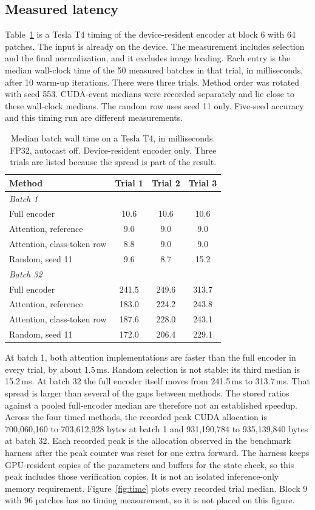 \documentclass[11pt]{article}
\begin{document}
\FloatBarrier
\subsection{Measured latency}
Table~\ref{tab:time} is a Tesla T4 timing of the device-resident encoder at block 6 with 64 patches.
The input is already on the device.
The measurement includes selection and the final normalization, and it excludes image loading.
Each entry is the median wall-clock time of the 50 measured batches in that trial, in milliseconds, after 10 warm-up iterations.
There were three trials.
Method order was rotated with seed 553.
CUDA-event medians were recorded separately and lie close to these wall-clock medians.
The random row uses seed 11 only.
Five-seed accuracy and this timing run are different measurements.

\begin{table}[t]
\centering
\caption{Median batch wall time on a Tesla T4, in milliseconds. FP32, autocast off. Device-resident encoder only. Three trials are listed because the spread is part of the result.}
\label{tab:time}
\small
\begin{tabular}{lccc}
\toprule
Method & Trial 1 & Trial 2 & Trial 3 \\
\midrule
\multicolumn{4}{l}{\emph{Batch 1}} \\
Full encoder & 10.6 & 10.6 & 10.6 \\
Attention, reference & 9.0 & 9.0 & 9.0 \\
Attention, class-token row & 8.8 & 9.0 & 9.0 \\
Random, seed 11 & 9.6 & 8.7 & 15.2 \\
\midrule
\multicolumn{4}{l}{\emph{Batch 32}} \\
Full encoder & 241.5 & 249.6 & 313.7 \\
Attention, reference & 183.0 & 224.2 & 243.8 \\
Attention, class-token row & 187.6 & 228.0 & 243.1 \\
Random, seed 11 & 172.0 & 206.4 & 229.1 \\
\bottomrule
\end{tabular}
\end{table}

At batch 1, both attention implementations are faster than the full encoder in every trial, by about 1.5\,ms.
Random selection is not stable: its third median is 15.2\,ms.
At batch 32 the full encoder itself moves from 241.5\,ms to 313.7\,ms.
That spread is larger than several of the gaps between methods.
The stored ratios against a pooled full-encoder median are therefore not an established speedup.
Across the four timed methods, the recorded peak CUDA allocation is 700{,}060{,}160 to 703{,}612{,}928 bytes at batch 1 and 931{,}190{,}784 to 935{,}139{,}840 bytes at batch 32.
Each recorded peak is the allocation observed in the benchmark harness after the peak counter was reset for one extra forward.
The harness keeps GPU-resident copies of the parameters and buffers for the state check, so this peak includes those verification copies.
It is not an isolated inference-only memory requirement.
Figure~\ref{fig:time} plots every recorded trial median.
Block 9 with 96 patches has no timing measurement, so it is not placed on this figure.
\end{document}
